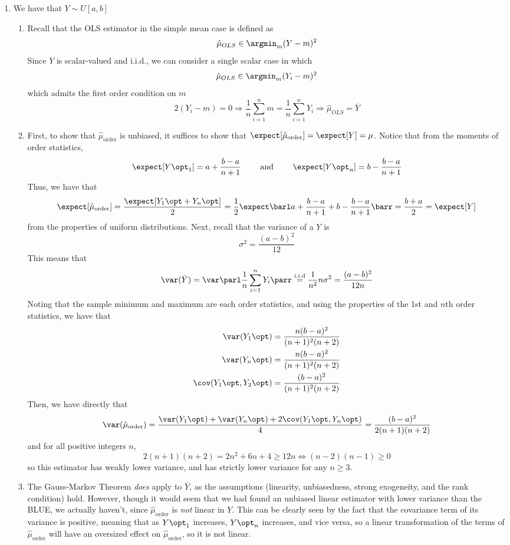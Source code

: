 \documentclass[10pt]{article}
\begin{document}
\maketitle


\begin{enumerate}
	\item We have that $Y \sim U[a,b]$ \begin{enumerate} \item Recall that the OLS estimator in the simple mean case is defined as \[\hat{\mu}_{OLS} \in \argmin_{m} (Y - m)^2 \]Since $Y$ is scalar-valued and i.i.d., we can consider a single scalar case in which \[\hat{\mu}_{OLS} \in \argmin_m (Y_i - m)^2\]which admits the first order condition on $m$\[2(Y_i - m) = 0 \Longrightarrow \frac{1}{n}\sum_{i=1}^n m = \frac{1}{n}\sum_{i=1}^n Y_i \Longrightarrow \hat{\mu}_{OLS} = \bar{Y}\] \item First, to show that $\hat{\mu}_{\text{order}}$ is unbiased, it suffices to show that $\expect[\hat{\mu}_{\text{order}}] = \expect[Y] = \mu$. Notice that from the moments of order statistics,\[\expect[Y\opt_1] = a + \frac{b-a}{n+1} \qquad \text{ and } \qquad \expect[Y\opt_n] = b - \frac{b-a}{n+1} \]Thus, we have that\[\expect[\hat{\mu}_{\text{order}}] = \frac{\expect[Y_1\opt + Y_n\opt]}{2} = \frac{1}{2}\expect\barl a + \frac{b-a}{n+1} + b -\frac{b-a}{n+1}\barr = \frac{b+a}{2} = \expect[Y]\]from the properties of uniform distributions. Next, recall that the variance of a $Y$ is \[\sigma^2 = \frac{(a-b)^2}{12}\]This means that\[\var(\bar{Y}) = \var\parl \frac{1}{n}\sum_{i=1}^n Y_i\parr \overset{\text{i.i.d}}{=} \frac{1}{n^2} n\sigma^2 = \frac{(a-b)^2}{12n}\]Noting that the sample minimum and maximum are each order statistics, and using the properties of the 1st and $n$th order statistics, we have that\begin{align*}\var(Y_1\opt) &= \frac{n(b-a)^2}{(n+1)^2(n+2)} \\ \var(Y_n\opt) &= \frac{n(b-a)^2}{(n+1)^2(n+2)} \\ \cov(Y_1\opt,Y_2\opt) &= \frac{(b-a)^2}{(n+1)^2(n+2)}\end{align*}Then, we have directly that\[\var(\hat{\mu}_{\text{order}}) = \frac{\var(Y_1\opt) + \var(Y_n\opt) + 2\cov(Y_1\opt,Y_n\opt)}{4} = \frac{(b-a)^2}{2(n+1)(n+2)} \]and for all positive integers $n$, \[2(n+1)(n+2) = 2n^2 + 6n + 4 \ge 12n \Longleftrightarrow (n-2)(n-1) \ge 0\] so this estimator has weakly lower variance, and has strictly lower variance for any $n \ge 3$. \item The Gauss-Markov Theorem \emph{does} apply to $\bar{Y}$, as the assumptions (linearity, unbiasedness, strong exogeneity, and the rank condition) hold. However, though it would seem that we had found an unbiased linear estimator with lower variance than the BLUE, we actually haven't, since $\hat{\mu}_{\text{order}}$ is \emph{not} linear in $Y$. This can be clearly seen by the fact that the covariance term of its variance is positive, meaning that as $Y\opt_1$ increases, $Y\opt_n$ increases, and vice versa, so a linear transformation of the terms of $\hat{\mu}_{\text{order}}$ will have an oversized effect on $\hat{\mu}_{\text{order}}$, so it is not linear.\end{enumerate}

\end{enumerate}
\end{document}
